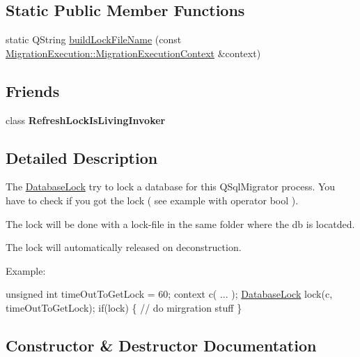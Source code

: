 \subsection*{Static Public Member Functions}
\begin{DoxyCompactItemize}
\item 
static Q\+String \hyperlink{class_q_sql_migrator_1_1_sqlite_migrator_1_1_database_lock_a77ec49dc6b304ebe0bdaada782eec6a6}{build\+Lock\+File\+Name} (const \hyperlink{class_q_sql_migrator_1_1_migration_execution_1_1_migration_execution_context}{Migration\+Execution\+::\+Migration\+Execution\+Context} \&context)
\end{DoxyCompactItemize}
\subsection*{Friends}
\begin{DoxyCompactItemize}
\item 
\mbox{\label{class_q_sql_migrator_1_1_sqlite_migrator_1_1_database_lock_afe7f8ba95d43a7df07ee63e6f4e06926}} 
class {\bfseries Refresh\+Lock\+Is\+Living\+Invoker}
\end{DoxyCompactItemize}


\subsection{Detailed Description}
The \hyperlink{class_q_sql_migrator_1_1_sqlite_migrator_1_1_database_lock}{Database\+Lock} try to lock a database for this Q\+Sql\+Migrator process. You have to check if you got the lock ( see example with operator bool ). 

The lock will be done with a lock-\/file in the same folder where the db is locatded.

The lock will automatically released on deconstruction.

Example\+:

unsigned int time\+Out\+To\+Get\+Lock = 60; context c( ... ); \hyperlink{class_q_sql_migrator_1_1_sqlite_migrator_1_1_database_lock}{Database\+Lock} lock(c, time\+Out\+To\+Get\+Lock); if(lock) \{ // do mirgration stuff \} 

\subsection{Constructor \& Destructor Documentation}
\mbox{\label{class_q_sql_migrator_1_1_sqlite_migrator_1_1_database_lock_abbbe7edb1c77fc3ed9a6a431b4d7cdcc}} 
